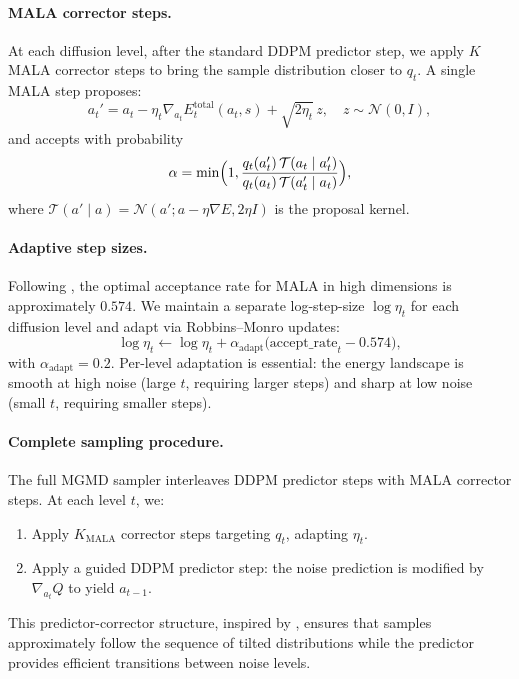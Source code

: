 \documentclass{article}
\theoremstyle{plain}
\theoremstyle{definition}
\theoremstyle{remark}
\begin{document}
\paragraph{MALA corrector steps.}
At each diffusion level, after the standard DDPM predictor step, we apply $K$ MALA corrector steps to bring the sample distribution closer to $q_t$.
A single MALA step proposes:
\begin{equation}
  a_t' = a_t - \eta_t \nabla_{a_t} E_t^{\text{total}}(a_t, s) + \sqrt{2\eta_t}\, z, \quad z \sim \mathcal{N}(0, I),
  \label{eq:mala-proposal}
\end{equation}
and accepts with probability
\begin{equation}
  \alpha = \min\Bigl(1, \frac{q_t(a_t') \, \mathcal{T}(a_t \mid a_t')}{q_t(a_t) \, \mathcal{T}(a_t' \mid a_t)}\Bigr),
  \label{eq:mh-accept}
\end{equation}
where $\mathcal{T}(a' \mid a) = \mathcal{N}(a' ; a - \eta \nabla E, 2\eta I)$ is the proposal kernel.

\paragraph{Adaptive step sizes.}
Following \citet{RobertsTweedie1996MALA}, the optimal acceptance rate for MALA in high dimensions is approximately $0.574$.
We maintain a separate log-step-size $\log \eta_t$ for each diffusion level and adapt via Robbins--Monro updates:
\begin{equation}
  \log \eta_t \leftarrow \log \eta_t + \alpha_{\text{adapt}} \bigl(\text{accept\_rate}_t - 0.574\bigr),
  \label{eq:eta-adapt}
\end{equation}
with $\alpha_{\text{adapt}} = 0.2$.
Per-level adaptation is essential: the energy landscape is smooth at high noise (large $t$, requiring larger steps) and sharp at low noise (small $t$, requiring smaller steps).

\paragraph{Complete sampling procedure.}
The full MGMD sampler interleaves DDPM predictor steps with MALA corrector steps.
At each level $t$, we:
\begin{enumerate}
  \item Apply $K_{\text{MALA}}$ corrector steps targeting $q_t$, adapting $\eta_t$.
  \item Apply a guided DDPM predictor step: the noise prediction is modified by $\nabla_{a_t} Q$ to yield $a_{t-1}$.
\end{enumerate}
This predictor-corrector structure, inspired by \citet{du2023reduce_reuse_recycle}, ensures that samples approximately follow the sequence of tilted distributions while the predictor provides efficient transitions between noise levels.
\end{document}
